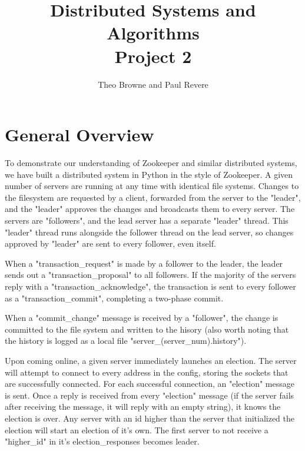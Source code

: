 \documentclass[12pt]{scrartcl}
\begin{document}
	\title{Distributed Systems and Algorithms\\Project 2}
	\author{Theo Browne and Paul Revere}
	\date{\vspace{-5ex}}

	\maketitle



	\section*{General Overview}

	To demonstrate our understanding of Zookeeper and similar distributed systems, we have built a distributed system in Python in the style of Zookeeper. A given number of servers are running at any time with identical file systems. Changes to the filesystem are requested by a client, forwarded from the server to the "leader", and the "leader" approves the changes and broadcasts them to every server. The servers are "followers", and the lead server has a separate "leader" thread. This "leader" thread runs alongside the follower thread on the lead server, so changes approved by "leader" are sent to every follower, even itself. 

	When a "transaction\_request" is made by a follower to the leader, the leader sends out a "transaction\_proposal" to all followers. If the majority of the servers reply with a "transaction\_acknowledge", the transaction is sent to every follower as a "transaction\_commit", completing a two-phase commit.

	When a "commit\_change" message is received by a "follower", the change is committed to the file system and written to the hisory (also worth noting that the history is logged as a local file "server\_(server\_num).history"). 

	Upon coming online, a given server immediately launches an election. The server will attempt to connect to every address in the config, storing the sockets that are successfully connected. For each successful connection, an "election" message is sent. Once a reply is received from every "election" message (if the server fails after receiving the message, it will reply with an empty string), it knows the election is over. Any server with an id higher than the server that initialized the election will start an election of it's own. The first server to not receive a "higher\_id" in it's election\_responses becomes leader. 
\end{document}

